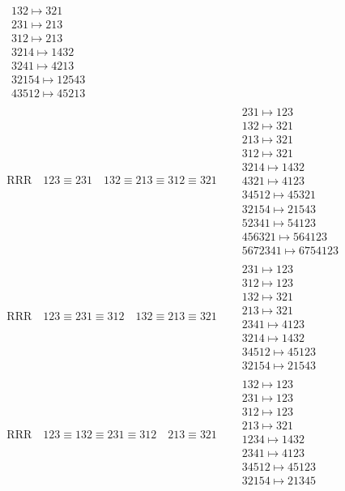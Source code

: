 \documentclass{article}
\begin{document}
\begin{align}
\begin{matrix}
132 \mapsto 321
\\
231 \mapsto 213
\\
312 \mapsto 213
\\
3214 \mapsto 1432
\\
3241 \mapsto 4213
\\
32154 \mapsto 12543
\\
43512 \mapsto 45213
\end{matrix}
\\
\text{RRR}
\quad
123\equiv231
\quad
132\equiv213\equiv312\equiv321
\quad
&
\begin{matrix}
231 \mapsto 123
\\
132 \mapsto 321
\\
213 \mapsto 321
\\
312 \mapsto 321
\\
3214 \mapsto 1432
\\
4321 \mapsto 4123
\\
34512 \mapsto 45321
\\
32154 \mapsto 21543
\\
52341 \mapsto 54123
\\
456321 \mapsto 564123
\\
5672341 \mapsto 6754123
\end{matrix}
\\
\text{RRR}
\quad
123\equiv231\equiv312
\quad
132\equiv213\equiv321
\quad
&
\begin{matrix}
231 \mapsto 123
\\
312 \mapsto 123
\\
132 \mapsto 321
\\
213 \mapsto 321
\\
2341 \mapsto 4123
\\
3214 \mapsto 1432
\\
34512 \mapsto 45123
\\
32154 \mapsto 21543
\end{matrix}
\\
\text{RRR}
\quad
123\equiv132\equiv231\equiv312
\quad
213\equiv321
\quad
&
\begin{matrix}
132 \mapsto 123
\\
231 \mapsto 123
\\
312 \mapsto 123
\\
213 \mapsto 321
\\
1234 \mapsto 1432
\\
2341 \mapsto 4123
\\
34512 \mapsto 45123
\\
32154 \mapsto 21345
\\

\end{matrix}
\end{align}
\end{document}
